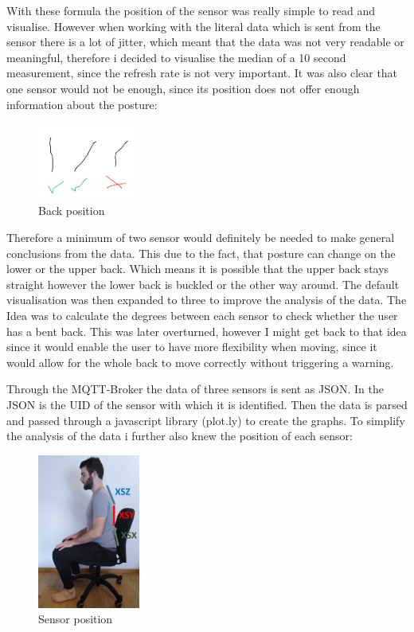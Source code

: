 With these formula the position of the sensor was really simple to read and visualise. However when working with the literal data which is sent from the sensor there is a lot of jitter, which meant that the data was not very readable or meaningful, therefore i decided to visualise the median of a 10 second measurement, since the refresh rate is not very important. It was also clear that one sensor would not be enough, since its position does not offer enough information about the posture: 

\begin{figure}[ht]
  \begin{center}
\includegraphics[width=0.3\textwidth]{images/Backposition.png}
  \end{center}
  \caption{Back position}
  \label{fig:BackPos}
\end{figure}

Therefore a minimum of two sensor would definitely be needed to make general conclusions from the data. This due to the fact, that posture can change on the lower or the upper back. Which means it is possible that the upper back stays straight however the lower back is buckled or the other way around. 
The default visualisation was then expanded to three to improve the analysis of the data.  The Idea was to calculate the degrees between each sensor to check whether the user has a bent back. This was later overturned, however I might get back to that idea since it would enable the user to have more flexibility when moving, since it would allow for the whole back to move correctly without triggering a warning.

Through the MQTT-Broker the data of three sensors is sent as JSON. In the JSON is the UID of the sensor with which it is identified. Then the data is parsed and passed through a javascript library (plot.ly) \cite{ModernAn18:online} to create the graphs. To simplify the analysis of the data i further also knew the position of each sensor:

\begin{figure}[ht]
  \begin{center}
\includegraphics[width=0.3\textwidth]{images/ChairVisualised.png}
  \end{center}
  \caption{Sensor position}
  \label{fig:SensorPos}
\end{figure}


